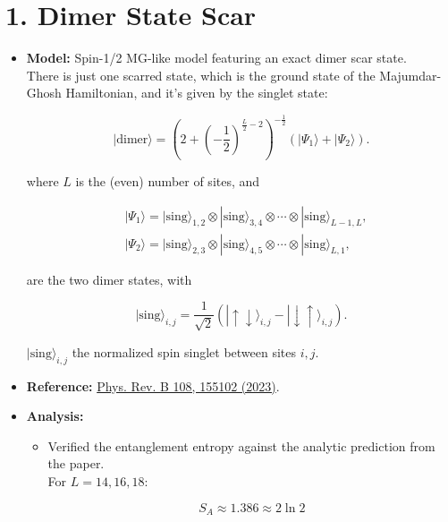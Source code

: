 \documentclass[11pt]{article}
\begin{document}
\section*{1. Dimer State Scar}
\begin{itemize}
    \item \textbf{Model:} Spin-1/2 MG-like model featuring an exact dimer scar state.\\ There is just one scarred state, which is the ground state of the Majumdar-Ghosh Hamiltonian, and it's given by the singlet state:
    
    \begin{equation}
    | \text{dimer} \rangle = \left( 2 + \left( -\frac{1}{2} \right)^{\frac{L}{2} - 2} \right)^{-\frac{1}{2}} \left( |\Psi_1\rangle + |\Psi_2\rangle \right).
    \end{equation}

    where $L$ is the (even) number of sites, and
    
    \begin{align}
    &|\Psi_1\rangle = | \text{sing} \rangle_{1,2} \otimes | \text{sing} \rangle_{3,4} \otimes \cdots \otimes | \text{sing} \rangle_{L-1,L}, \\
    &|\Psi_2\rangle = | \text{sing} \rangle_{2,3} \otimes | \text{sing} \rangle_{4,5} \otimes \cdots \otimes | \text{sing} \rangle_{L,1},
    \end{align}
    
    are the two dimer states, with
    
    \begin{equation}
    | \text{sing} \rangle_{i,j} = \frac{1}{\sqrt{2}} \left( | \uparrow \downarrow \rangle_{i,j} - | \downarrow \uparrow \rangle_{i,j} \right).
    \end{equation}
    
    $| \text{sing} \rangle_{i,j}$ the normalized spin singlet between sites $i,j$.
       
    \item \textbf{Reference:} \href{https://journals.aps.org/prb/abstract/10.1103/PhysRevB.108.155102}{Phys. Rev. B 108, 155102 (2023)}.
    \item \textbf{Analysis:}
    \begin{itemize}
        \item Verified the entanglement entropy against the analytic prediction from the paper.\\ For $L=14,16,18$:
        
        \begin{equation}
        S_A \approx 1.386 \approx 2 \ln 2
        \end{equation}
        

\end{itemize}
\end{itemize}
\end{document}
